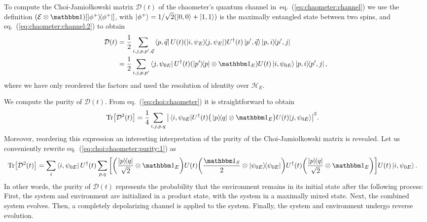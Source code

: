 \documentclass[10pt,letterpaper]{article}
\newcommand{\eref}[1]{eq.~(\ref{#1})}
\newcommand{\mcE}{\mathcal E}
\newcommand{\mcD}{\mathcal D}
\newcommand{\mcH}{\mathcal H}
\newcommand{\jami}{Jamiołkowski}
\begin{document}
To compute the Choi-\jami{} matrix $\mcD(t)$ of the chaometer's quantum channel 
in~\eref{eq:chaometer:channel} we use the definition 
$\qty(\mcE \otimes \one) \qty[\dyad{\phi^+}]$, with $\ket{\phi^+}=1/\sqrt{2}\qty(\ket{0,0} + \ket{1,1})$
is the maximally entangled state between two spins, and \eref{eq:chaometer:channel:2} to obtain
\begin{align}
\mcD(t) &=  
\frac{1}{2} 
\sum_{i, j, p, p', \vec q}
\bra{p, \vec q}
U(t) \qty(\dyad{i,\psi_{E}}{j,\psi_{E}}) U^\dagger(t)
\ket{p', \vec q}
\dyad{p,i}{p',j} \\
&= \label{eq:choi:chaometer:computational:basis}
\frac{1}{2}
\sum_{i, j, p, p'}
\bra{j, \psi_{0E}} U^\dagger(t) \qty( \dyad{p'}{p}\otimes \one_E ) U(t)
\ket{i, \psi_{0E}} \dyad{p, i}{p', j},
\end{align}
where we have only reordered the factors and used the resolution of identity over 
$\mcH_E$.

We compute the purity of $\mcD(t)$. From \eref{eq:choi:chaometer} 
it is straightforward to obtain
\begin{align}\label{eq:choi:chaometer:purity:1}
\Tr[\mcD^2(t)]  &= 
\frac{1}{4}
\sum_{i,j,p,q}
\abs{\matrixel{i, \psi_{0E}}
{U^\dagger(t) \big(\dyad{p}{q} \otimes \one_E\big) U(t)}
{j, \psi_{0E}}
}^2.
\end{align}
Moreover, reordering this expression an interesting interpretation of the purity 
of the Choi-\jami{} matrix is revealed. Let us conveniently rewrite
\eref{eq:choi:chaometer:purity:1} as
\begin{align}\label{eq:choi:chaometer:purity:2}
\Tr[\mcD^2(t)]  &= 
\sum_i
\bra{i, \psi_{0E}}
U^\dagger(t) 
\sum_{p, q} \qty[
\qty(\frac{\dyad{p}{q}}{\sqrt{2}} \otimes \one_E ) 
U(t)
\qty( \frac{\one_S}{2} \otimes \dyad{\psi_{0E}})
U^\dagger(t) 
\qty(\frac{\dyad{p}{q}}{\sqrt{2}} \otimes \one_E ) 
]
U(t)
\ket{i, \psi_{0E}}.
\end{align}
In other words, the purity of $\mcD(t)$ represents the probability that the 
environment remains in its initial state after the following process: First, the system
and environment are initialized in a product state, with the system in a maximally
mixed state. Next, the combined system evolves. Then, a completely depolarizing
channel is applied to the system. Finally, the system and environment undergo 
reverse evolution.
\end{document}
